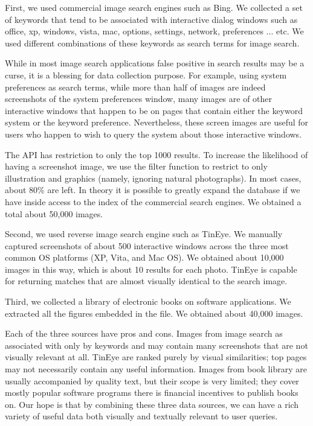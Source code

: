 First, we used commercial image search engines such as Bing. We
collected a set of keywords that tend to be associated with
interactive dialog windows such as office, xp, windows, vista,
mac, options, settings, network, preferences ... etc. We used
different combinations of these keywords as search terms for image
search.

While in most image search applications false positive in search
results may be a curse, it is a blessing for data collection
purpose. For example, using system preferences as search terms,
while more than half of images are indeed screenshots of the
system preferences window, many images are of other interactive
windows that happen to be on pages that contain either the keyword
system or the keyword preference. Nevertheless, these screen
images are useful for users who happen to wish to query the system
about those interactive windows.

The API has restriction to only the top 1000 results. To increase
the likelihood of having a screenshot image, we use the filter
function to restrict to only illustration and graphics (namely,
ignoring natural photographs). In most cases, about 80\% are left.
In theory it is possible to greatly expand the database if we have
inside access to the index of the commercial search engines. We
obtained a total about 50,000 images.


Second, we used reverse image search engine such as TinEye. We
manually captured screenshots of about 500 interactive windows
across the three most common OS platforms (XP, Vita, and Mac OS).
We obtained about 10,000 images in this way, which is about 10
results for each photo. TinEye is capable for returning matches
that are almost visually identical to the search image.

Third, we collected a library of electronic books on software
applications. We extracted all the figures embedded in the file.
We obtained about 40,000 images.

Each of the three sources have pros and cons. Images from image
search as associated with only by keywords and may contain many
screenshots that are not visually relevant at all. TinEye are
ranked purely by visual similarities; top pages may not
necessarily contain any useful information. Images from book
library are usually accompanied by quality text, but their scope
is very limited; they cover mostly popular software programs there
is financial incentives to publish books on. Our hope is that by
combining these three data sources, we can have a rich variety of
useful data both visually and textually relevant to user queries.


